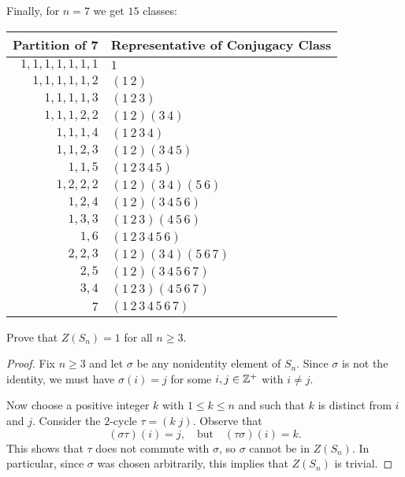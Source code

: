 \begin{solution}
  Finally, for $n = 7$ we get $15$ classes:
  \begin{center}
    \begin{tabular}{r|l}
      \bf Partition of 7 & \bf Representative of Conjugacy Class \\
      \hline
      $1, 1, 1, 1, 1, 1, 1$ & $1$ \\
      $1, 1, 1, 1, 1, 2$ & $(1\,2)$ \\
      $1, 1, 1, 1, 3$ & $(1\,2\,3)$ \\
      $1, 1, 1, 2, 2$ & $(1\,2)(3\,4)$ \\
      $1, 1, 1, 4$ & $(1\,2\,3\,4)$ \\
      $1, 1, 2, 3$ & $(1\,2)(3\,4\,5)$ \\
      $1, 1, 5$ & $(1\,2\,3\,4\,5)$ \\
      $1, 2, 2, 2$ & $(1\,2)(3\,4)(5\,6)$ \\
      $1, 2, 4$ & $(1\,2)(3\,4\,5\,6)$ \\
      $1, 3, 3$ & $(1\,2\,3)(4\,5\,6)$ \\
      $1, 6$ & $(1\,2\,3\,4\,5\,6)$ \\
      $2, 2, 3$ & $(1\,2)(3\,4)(5\,6\,7)$ \\
      $2, 5$ & $(1\,2)(3\,4\,5\,6\,7)$ \\
      $3, 4$ & $(1\,2\,3)(4\,5\,6\,7)$ \\
      $7$ & $(1\,2\,3\,4\,5\,6\,7)$
    \end{tabular}
  \end{center}
\end{solution}

 Prove that $Z(S_n) = 1$ for all $n\geq3$.
\begin{proof}
  Fix $n\geq3$ and let $\sigma$ be any nonidentity element of
  $S_n$. Since $\sigma$ is not the identity, we must have
  $\sigma(i) = j$ for some $i, j\in\mathbb{Z}^+$ with $i\neq j$.

  Now choose a positive integer $k$ with $1\leq k\leq n$ and such that
  $k$ is distinct from $i$ and $j$. Consider the $2$-cycle
  $\tau = (k\;j)$. Observe that
  \begin{equation*}
    (\sigma\tau)(i) = j, \quad\text{but}\quad (\tau\sigma)(i) = k.
  \end{equation*}
  This shows that $\tau$ does not commute with $\sigma$, so $\sigma$
  cannot be in $Z(S_n)$. In particular, since $\sigma$ was chosen
  arbitrarily, this implies that $Z(S_n)$ is trivial.
\end{proof}
